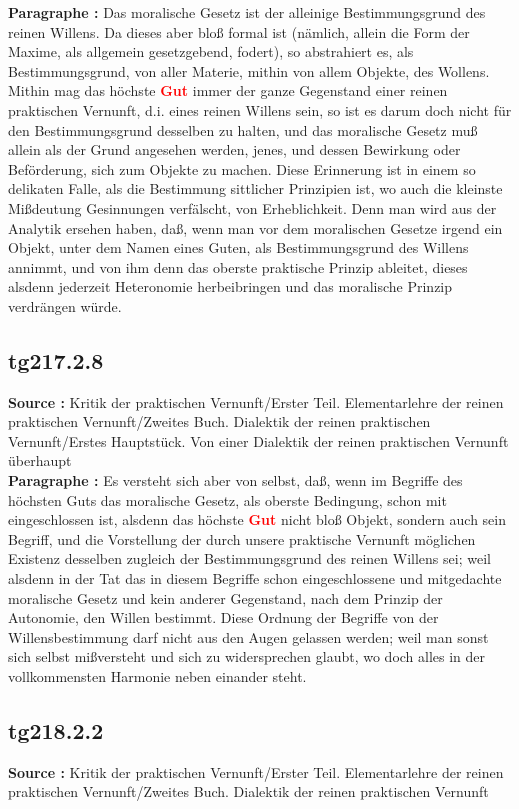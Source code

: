 \documentclass[a4paper,12pt,twoside]{book}
\newcommand{\match}[1]{\textcolor{red}{\textbf{#1}}}
\begin{document}
	\textbf{Paragraphe : }Das moralische Gesetz ist der alleinige Bestimmungsgrund des reinen Willens. Da dieses aber bloß formal ist (nämlich, allein die Form der Maxime, als allgemein gesetzgebend, fodert), so abstrahiert es, als Bestimmungsgrund, von aller Materie, mithin von allem Objekte, des Wollens. Mithin mag das höchste \match{Gut} immer der ganze Gegenstand einer reinen praktischen Vernunft, d.i. eines reinen Willens sein, so ist es darum doch nicht für den Bestimmungsgrund desselben zu halten, und das moralische Gesetz muß allein als der Grund angesehen werden, jenes, und dessen Bewirkung oder Beförderung, sich zum Objekte zu machen. Diese Erinnerung ist in einem so delikaten Falle, als die Bestimmung sittlicher Prinzipien ist, wo auch die kleinste Mißdeutung Gesinnungen verfälscht, von Erheblichkeit. Denn man wird aus der Analytik ersehen haben, daß, wenn man vor dem moralischen Gesetze irgend ein Objekt, unter dem Namen eines Guten, als Bestimmungsgrund des Willens annimmt, und von ihm denn das oberste praktische Prinzip ableitet, dieses alsdenn jederzeit Heteronomie herbeibringen und das moralische Prinzip verdrängen würde. 
	
	\subsection*{tg217.2.8} 
	\textbf{Source : }Kritik der praktischen Vernunft/Erster Teil. Elementarlehre der reinen praktischen Vernunft/Zweites Buch. Dialektik der reinen praktischen Vernunft/Erstes Hauptstück. Von einer Dialektik der reinen praktischen Vernunft überhaupt\\  
	
	\textbf{Paragraphe : }Es versteht sich aber von selbst, daß, wenn im Begriffe des höchsten Guts das moralische Gesetz, als oberste Bedingung, schon mit eingeschlossen ist, alsdenn das höchste \match{Gut} nicht bloß Objekt, sondern auch sein Begriff, und die Vorstellung der durch unsere praktische Vernunft möglichen Existenz desselben zugleich der Bestimmungsgrund des reinen Willens sei; weil alsdenn in der Tat das in diesem Begriffe schon eingeschlossene und mitgedachte moralische Gesetz und kein anderer Gegenstand, nach dem Prinzip der Autonomie, den Willen bestimmt. Diese Ordnung der Begriffe von der Willensbestimmung darf nicht aus den Augen gelassen werden; weil man sonst sich selbst mißversteht und sich zu widersprechen glaubt, wo doch alles in der vollkommensten Harmonie neben einander steht. 
	
	\subsection*{tg218.2.2} 
	\textbf{Source : }Kritik der praktischen Vernunft/Erster Teil. Elementarlehre der reinen praktischen Vernunft/Zweites Buch. Dialektik der reinen praktischen Vernunft\\  
	
\end{document}

